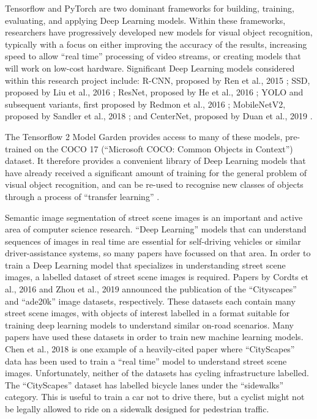 \documentclass[11pt,twoside]{report}
\begin{document}
Tensorflow \cite{TENSORFLOW2016A} \cite{TENSORFLOW2016B} and PyTorch \cite{pytorch} are two dominant frameworks for building, training, evaluating, and applying Deep Learning models.  Within these frameworks, researchers have progressively developed new models for visual object recognition, typically with a focus on either improving the accuracy of the results, increasing speed to allow ``real time'' processing of video streams, or creating models that will work on low-cost hardware.  Significant Deep Learning models considered within this research project include: R-CNN, proposed by Ren et al., 2015 \cite{REN2016}; SSD, proposed by Liu et al., 2016 \cite{ssd}; ResNet, proposed by He et al., 2016 \cite{He_2016_CVPR}; YOLO and subsequent variants, first proposed by Redmon et al., 2016 \cite{YOLOv1}; MobileNetV2, proposed by Sandler et al., 2018 \cite{MobileNetV2}; and CenterNet, proposed by Duan et al., 2019 \cite{centernet}.

The Tensorflow 2 Model Garden \cite{zoo} provides access to many of these models, pre-trained on the COCO 17 (``Microsoft COCO: Common Objects in Context'') dataset.  It therefore provides a convenient library of Deep Learning models that have already received a significant amount of training for the general problem of visual object recognition, and can be re-used to recognise new classes of objects through a process of ``transfer learning'' \cite{coco} \cite{transferlearning}.

Semantic image segmentation of street scene images is an important and active area of computer science research.  ``Deep Learning'' models that can understand sequences of images in real time are essential for self-driving vehicles or similar driver-assistance systems, so many papers have focussed on that area.  In order to train a Deep Learning model that specializes in understanding street scene images, a labelled dataset of street scene images is required.  Papers by Cordts et al., 2016 \cite{Cordts_2016_CVPR} and Zhou et al., 2019 \cite{ade20k} announced the publication of the ``Cityscapes'' and ``ade20k'' image datasets, respectively.  These datasets each contain many street scene images, with objects of interest labelled in a format suitable for training deep learning models to understand similar on-road scenarios.  Many papers have used these datasets in order to train new machine learning models.  Chen et al., 2018 \cite{DEEPLAB} is one example of a heavily-cited paper where ``CityScapes'' data has been used to train a ``real time'' model to understand street scene images.  Unfortunately, neither of the datasets has cycling infrastructure labelled.  The ``CityScapes'' dataset has labelled bicycle lanes under the ``sidewalks'' category.  This is useful to train a car not to drive there, but a cyclist might not be legally allowed to ride on a sidewalk designed for pedestrian traffic.  
\end{document}
